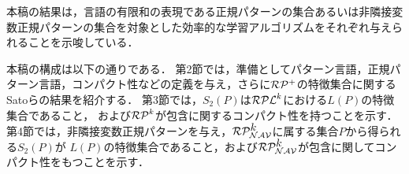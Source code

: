 本稿の結果は，言語の有限和の表現である正規パターンの集合あるいは非隣接変数正規パターンの集合を対象とした効率的な学習アルゴリズムをそれぞれ与えられることを示唆している．

本稿の構成は以下の通りである．
第2節では，準備としてパターン言語，正規パターン言語，コンパクト性などの定義を与え，さらに$\mathcal{RP^{+}}$の特徴集合に関するSatoらの結果を紹介する．
第3節では，$S_{2}(P)$は$\mathcal{RPL}^{k}$における$L(P)$の特徴集合であること，
および$\mathcal{RP}^{k}$が包含に関するコンパクト性を持つことを示す．
第4節では，非隣接変数正規パターンを与え，$\mathcal{RP^{\mbox{$k$}}_{NAV}}$に属する集合$P$から得られる$S_2(P)$が
$L(P)$の特徴集合であること，および$\mathcal{RP^{\mbox{$k$}}_{NAV}}$が包含に関してコンパクト性をもつことを示す．




